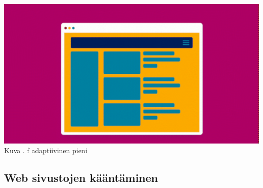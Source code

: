 \documentclass[11pt,a4paper,titlepage,oneside]{article}
\begin{document}
\bigskip

\includegraphics[width = 15cm]{src/public/oppar/adaptivesmall.png}\\
Kuva \getImgCount {}. f adaptiivinen pieni\citemissing




















\newpage
\subsection{Web sivustojen kääntäminen}















\end{document}
